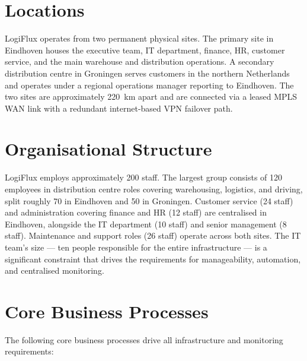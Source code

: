 \section{Locations}

LogiFlux operates from two permanent physical sites. The primary site in Eindhoven houses the executive team, IT department, finance, HR, customer service, and the main warehouse and distribution operations. A secondary distribution centre in Groningen serves customers in the northern Netherlands and operates under a regional operations manager reporting to Eindhoven. The two sites are approximately 220~km apart and are connected via a leased MPLS WAN link with a redundant internet-based VPN failover path.

\section{Organisational Structure}

\label{tab:personnel}LogiFlux employs approximately 200 staff. The largest group consists of 120 employees in distribution centre roles covering warehousing, logistics, and driving, split roughly 70 in Eindhoven and 50 in Groningen. Customer service (24 staff) and administration covering finance and HR (12 staff) are centralised in Eindhoven, alongside the IT department (10 staff) and senior management (8 staff). Maintenance and support roles (26 staff) operate across both sites. The IT team's size --- ten people responsible for the entire infrastructure --- is a significant constraint that drives the requirements for manageability, automation, and centralised monitoring.

\section{Core Business Processes}

The following core business processes drive all infrastructure and monitoring requirements:

